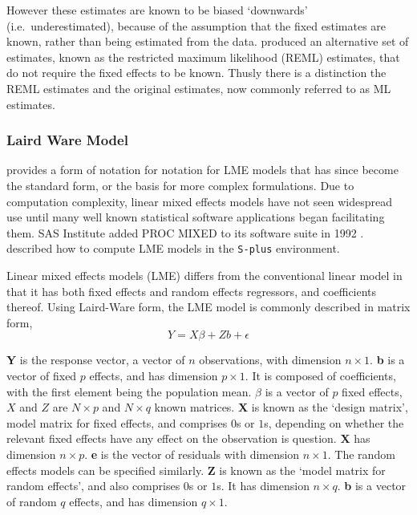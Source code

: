 \documentclass[12pt, a4paper]{report}
\theoremstyle{plain}
\theoremstyle{definition}
\theoremstyle{remark}
\begin{document}
	
	However these estimates are known to be biased `downwards' (i.e.\ underestimated), because of the assumption that the fixed estimates are known, rather than being estimated from the data. \citet{PattersonThompson} produced an alternative set of estimates, known as the restricted maximum likelihood (REML) estimates, that do not require the fixed effects to be known. Thusly there is a distinction the REML estimates and the original estimates, now commonly referred to as ML estimates.
	
	
	
	\subsubsection{Laird Ware Model} 
	\citet{LW82} provides a form of notation for notation for LME models that has since become the standard form, or the basis for more complex formulations. Due to computation complexity, linear mixed effects models have not seen widespread use until many well known statistical software applications began facilitating them. SAS Institute added PROC MIXED to its software suite in 1992 \citep{singer}. \citet{PB} described how to compute LME models in the \texttt{S-plus} environment.
	
	Linear mixed effects models (LME)
	differs from the conventional linear model in that it has both
	fixed effects and random effects regressors, and coefficients
	thereof. 	Using Laird-Ware form, the LME model is commonly described in matrix form,
	\begin{equation}
	Y = X\beta + Zb + \epsilon
	\label{LW}
	\end{equation}
	
	\textbf{Y} is the response vector, a vector of $n$ observations, with dimension $n
	\times 1$. \textbf{b} is a vector of fixed $p$ effects, and has
	dimension $p \times 1$. It is composed of coefficients, with the
	first element being the population mean.  $\beta$ is a vector of $p$ fixed effects, $X$ and $Z$ are $N \times p$ and $N \times q$ known matrices. \textbf{X} is known as
	the `design matrix', model matrix for fixed effects, and comprises
	$0$s or $1$s, depending on whether the relevant fixed effects have
	any effect on the observation is question. \textbf{X} has
	dimension $n \times p$. \textbf{e} is the vector of residuals with
	dimension $n \times 1$. The random effects models can be specified similarly. \textbf{Z}
	is known as the `model matrix for random effects', and also
	comprises $0$s or $1$s. It has dimension $n \times q$. \textbf{b
	}is a vector of random $q$ effects, and has dimension $q \times
	1$.
	
\end{document}
